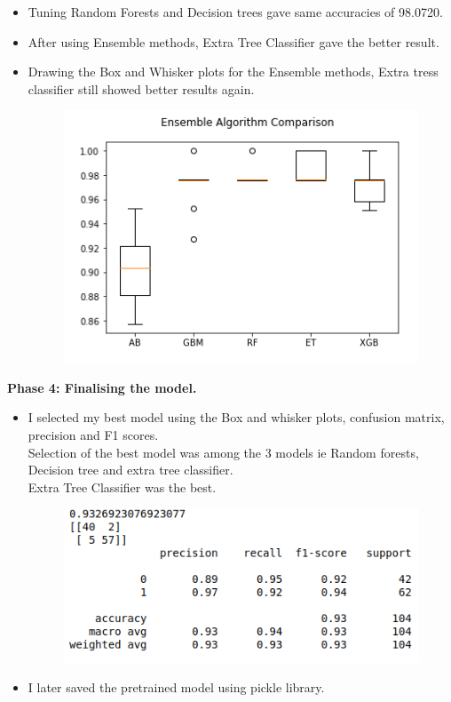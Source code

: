 \documentclass[11pt]{article}
\begin{document}
\begin{itemize}
	\item Tuning Random Forests and Decision trees gave same accuracies of 98.0720.\\
	
	\item After using Ensemble methods, Extra Tree Classifier gave the better result.\\
	
	\item Drawing the Box and Whisker plots for the Ensemble methods, Extra tress classifier still showed better results again.\\
	
	\begin{figure}[h]
		\centerline{\small 
			\includegraphics[height=0.2\textheight]  {box3}}
	\end{figure}
	
	
	
\end{itemize}

\newpage
\textbf{Phase 4: Finalising the model.}
\begin{itemize}
	\item I selected my best model using the Box and whisker plots, confusion matrix, precision and F1 scores.\\
	Selection of the best model was among the 3 models ie Random forests, Decision tree and extra tree classifier.\\
	Extra Tree Classifier was the best.\\
	\begin{figure}[h]
		\centerline{\small 
			\includegraphics[height=0.2\textheight]  {res}}
	\end{figure}
	
	\item I later saved the pretrained model using pickle library.\\
	
	
	
\end{itemize}
\end{document}
